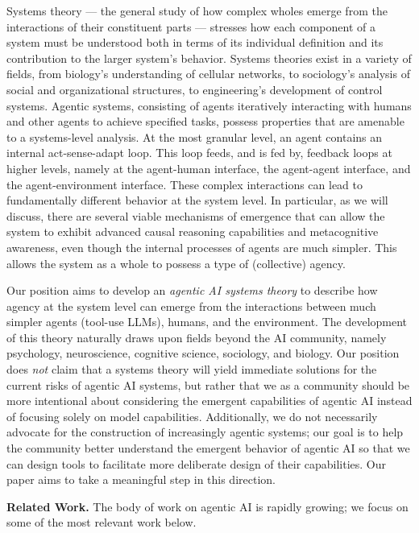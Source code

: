 \documentclass{article}
\theoremstyle{plain}
\theoremstyle{definition}
\theoremstyle{remark}
\begin{document}
Systems theory \cite{wiener1948cybernetics,boulding1953organizational,ashby1956introduction,bertalanffy1968general,astrom2008feedback} --- the general study of how complex wholes emerge from the interactions of their constituent parts --- stresses how each component of a system must be understood both in terms of its individual definition and its contribution to the larger system's behavior. Systems theories exist in a variety of fields, from biology's understanding of cellular networks, to sociology's analysis of social and organizational structures, to engineering's development of control systems. Agentic systems, consisting of agents iteratively interacting with humans and other agents to achieve specified tasks, possess properties that are amenable to a systems-level analysis. At the most granular level, an agent contains an internal act-sense-adapt loop. This loop feeds, and is fed by, feedback loops at higher levels, namely at the agent-human interface, the agent-agent interface, and the agent-environment interface. These complex interactions can lead to fundamentally different behavior at the system level. In particular, as we will discuss, there are several viable mechanisms of emergence that can allow the system to exhibit advanced causal reasoning capabilities and metacognitive awareness, even though the internal processes of agents are much simpler. This allows the system as a whole to possess a type of (collective) agency. 

Our position aims to develop an \emph{agentic AI systems theory} to describe how agency at the system level can emerge from the interactions between much simpler agents (tool-use LLMs), humans, and the environment. The development of this theory naturally draws upon fields beyond the AI community, namely psychology, neuroscience, cognitive science, sociology, and biology. Our position does \emph{not} claim that a systems theory will yield immediate solutions for the current risks of agentic AI systems, but rather that we as a community should be more intentional about considering the emergent capabilities of agentic AI instead of focusing solely on model capabilities. Additionally, we do not necessarily advocate for the construction of increasingly agentic systems; our goal is to help the community better understand the emergent behavior of agentic AI so that we can 
design tools to facilitate more deliberate design of their capabilities. Our paper aims to take a meaningful step in this direction.
 

{\bf Related Work.} The body of work on agentic AI is rapidly growing; we focus on some of the most relevant work below.
\end{document}
